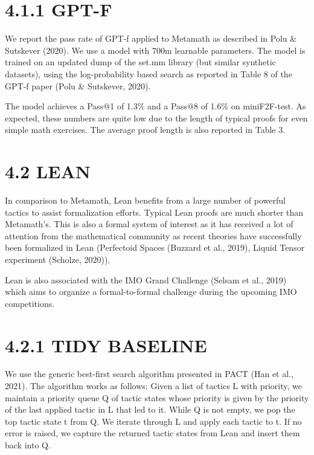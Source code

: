 \documentclass[
]{article}
\begin{document}
\section{4.1.1 GPT-F}\label{gpt-f}

We report the pass rate of GPT-f applied to Metamath as described in
Polu \& Sutskever (2020). We use a model with 700m learnable parameters.
The model is trained on an updated dump of the set.mm library (but
similar synthetic datasets), using the log-probability based search as
reported in Table 8 of the GPT-f paper (Polu \& Sutskever, 2020).

The model achieves a Pass@1 of 1.3\% and a Pass@8 of 1.6\% on
miniF2F-test. As expected, these numbers are quite low due to the length
of typical proofs for even simple math exercises. The average proof
length is also reported in Table 3.

\section{4.2 LEAN}\label{lean}

In comparison to Metamath, Lean benefits from a large number of powerful
tactics to assist formalization efforts. Typical Lean proofs are much
shorter than Metamath's. This is also a formal system of interest as it
has received a lot of attention from the mathematical community as
recent theories have successfully been formalized in Lean (Perfectoid
Spaces (Buzzard et al., 2019), Liquid Tensor experiment (Scholze,
2020)).

Lean is also associated with the IMO Grand Challenge (Selsam et al.,
2019) which aims to organize a formal-to-formal challenge during the
upcoming IMO competitions.

\section{4.2.1 TIDY BASELINE}\label{tidy-baseline}

We use the generic best-first search algorithm presented in PACT (Han et
al., 2021). The algorithm works as follows: Given a list of tactics L
with priority, we maintain a priority queue Q of tactic states whose
priority is given by the priority of the last applied tactic in L that
led to it. While Q is not empty, we pop the top tactic state t from Q.
We iterate through L and apply each tactic to t. If no error is raised,
we capture the returned tactic states from Lean and insert them back
into Q.
\end{document}
